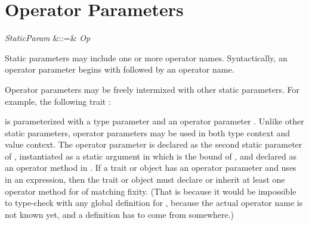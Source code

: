 \section{Operator Parameters}
\begin{Grammar}
\emph{StaticParam} &::=&  \emph{Op} \\
\end{Grammar}

Static parameters may include one or more operator names.
Syntactically, an operator parameter begins with
 followed by an operator name.


Operator parameters may be freely intermixed with other
static parameters.  For example, the following trait :

is parameterized with a type parameter  and
an operator parameter \EXP{\odot}.
Unlike other static parameters,
operator parameters may be used in both type context and
value context.  The operator parameter \EXP{\odot}
is declared as the second static parameter of ,
instantiated as a static argument in
which is the bound of ,
and declared as an operator method in .
If a trait or object has an operator parameter  and uses 
in an expression, then the trait or object must declare or inherit
at least one operator method for  of matching fixity.
(That is because it would be impossible to type-check 
with any global definition for ,
because the actual operator name is not known
yet, and a definition has to come from somewhere.)


